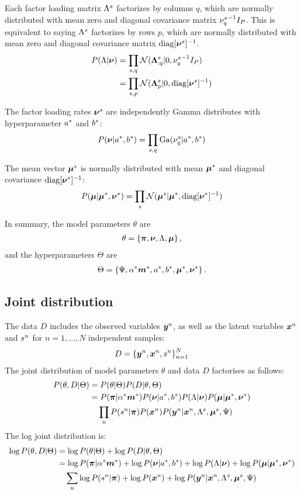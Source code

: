 \documentclass[a4paper]{article}
\begin{document}
Each factor loading matrix $\Lambda^s$ factorizes by columns $q$, which are normally distributed with mean zero and diagonal covariance matrix ${\nu^s_q}^{-1}I_P$. This is equivalent to saying $\Lambda^s$ factorizes by rows $p$, which are normally distributed with mean zero and diagonal covariance matrix $\operatorname{diag}[\boldsymbol{\nu}^s]^{-1}$.
\begin{align}
  P(\Lambda|\boldsymbol{\nu})&=\prod_{s,q}\mathcal{N}(\boldsymbol{\Lambda}^s_{:q}|0,{\nu^s_q}^{-1}I_P) \\
                &=\prod_{s,p}\mathcal{N}(\boldsymbol{\Lambda}^s_p|0,\operatorname{diag}[\boldsymbol{\nu}^s]^{-1})
\end{align}

The factor loading rates $\boldsymbol{\nu}^s$ are independently Gamma distributes with hyperparameter $a^*$ and $b^*$:
\begin{align}
  P(\boldsymbol{\nu}|a^*,b^*)=\prod_{s,q}\operatorname{Ga}(\nu^s_q|a^*,b^*)
\end{align}

The mean vector $\boldsymbol{\mu}^s$ is normally distributed with mean $\boldsymbol{\mu}^*$ and diagonal covariance $\operatorname{diag}[\boldsymbol{\nu}^*]^{-1}$:
\begin{align}
  P(\boldsymbol{\mu}|\boldsymbol{\mu}^*,\boldsymbol{\nu}^*)=\prod_s\mathcal{N}(\boldsymbol{\mu}^s|\boldsymbol{\mu}^*,\operatorname{diag}[\boldsymbol{\nu}^*]^{-1})
\end{align}

In summary, the model parameters $\theta$ are
\begin{align}
  \theta=\left\{\boldsymbol{\pi},\boldsymbol{\nu},\Lambda,\boldsymbol{\mu}\right\},
\end{align}
and the hyperparameters $\Theta$ are
\begin{align}
  \Theta=\left\{\Psi,\alpha^*\boldsymbol{m}^*,a^*,b^*,\boldsymbol{\mu}^*,\boldsymbol{\nu}^*\right\}.
\end{align}

\subsection{Joint distribution}
The data $D$ includes the observed variables $\boldsymbol{y}^n$, as well as the latent variables $\boldsymbol{x}^n$ and $s^n$ for $n=1,\dots,N$ independent samples:
\begin{align}
  D=\left\{\boldsymbol{y}^n,\boldsymbol{x}^n,s^n\right\}_{n=1}^N
\end{align}
The joint distribution of model parameters $\theta$ and data $D$ factorises as follows:
\begin{align}
  P(\theta,D|\Theta)&=P(\theta|\Theta)P(D|\theta,\Theta) \\
  &=P(\boldsymbol{\pi}|\alpha^*\boldsymbol{m}^*)P(\boldsymbol{\nu}|a^*,b^*)P(\Lambda|\boldsymbol{\nu})P(\boldsymbol{\mu}|\boldsymbol{\mu}^*,\boldsymbol{\nu}^*) \\
  &\quad \prod_n P(s^n|\boldsymbol{\pi})P(\boldsymbol{x}^n)P(\boldsymbol{y}^n|\boldsymbol{x}^n,\Lambda^s,\boldsymbol{\mu}^s,\Psi)
\end{align}
The log joint distribution is:
\begin{align}
  \log P(\theta,D|\Theta)&= \log P(\theta|\Theta) + \log P(D|\theta,\Theta) \\
  &=\log P(\boldsymbol{\pi}|\alpha^*\boldsymbol{m}^*) + \log P(\boldsymbol{\nu}|a^*,b^*) + \log P(\Lambda|\boldsymbol{\nu}) + \log P(\boldsymbol{\mu}|\boldsymbol{\mu}^*,\boldsymbol{\nu}^*) \\
  &\quad \sum_n \log P(s^n|\boldsymbol{\pi}) + \log P(\boldsymbol{x}^n) + \log P(\boldsymbol{y}^n|\boldsymbol{x}^n,\Lambda^s,\boldsymbol{\mu}^s,\Psi)
  \label{eq:log_joint}
\end{align}
\end{document}

